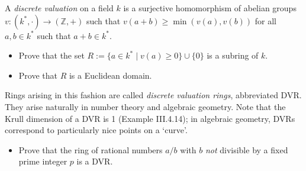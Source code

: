 \documentclass[../../master.tex]{subfiles}
\begin{document}
    \begin{problem}
        A \textit{discrete valuation} on a field $k$ is a surjective
        homomorphism of abelian groups $v : (k^{*}, \cdot) \to (\mathbb{Z}, +)$
        such that $v(a + b) \geq \min(v(a), v(b))$ for all $a, b \in k^{*}$ such
        that $a + b \in k^{*}$.
        \begin{itemize}
            \item Prove that the set $R := \{a \in k^{*} \mid v(a) \geq 0 \}
                \cup \{0\}$ is a subring of $k$.
            \item Prove that $R$ is a Euclidean domain.
        \end{itemize}
        Rings arising in this fashion are called \textit{discrete valuation
        rings}, abbreviated DVR. They arise naturally in number theory and
        algebraic geometry. Note that the Krull dimension of a DVR is 1 (Example
        III.4.14); in algebraic geometry, DVRs correspond to particularly nice
        points on a `curve'.
        \begin{itemize}
            \item Prove that the ring of rational numbers $a / b$ with $b$ 
                \textit{not} divisible by a fixed prime integer $p$ is a DVR.
        \end{itemize}
    \end{problem}
\end{document}

